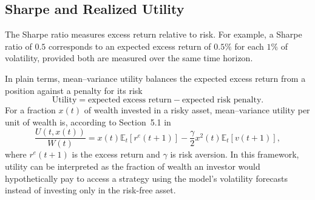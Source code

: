 \documentclass[12pt,a4paper]{article}
\numberwithin{equation}{section}
\numberwithin{table}{section}
\numberwithin{figure}{section}
\begin{document}
\subsection{Sharpe and Realized Utility}

The Sharpe ratio measures excess return relative to risk. For example, a Sharpe ratio of $0.5$ corresponds to an expected excess return of $0.5\%$ for each $1\%$ of volatility, provided both are measured over the same time horizon. 

In plain terms, mean--variance utility balances the expected excess return from a position against a penalty for its risk
\begin{equation*}
\text{Utility}=\text{expected excess return}-\text{expected risk penalty}.
\end{equation*}
For a fraction $x(t)$ of wealth invested in a risky asset, mean--variance utility per unit of wealth is, according to Section~5.1 in \cite{bollerslev2018risk}
\begin{equation}\label{eq:mean-variance-utility}
\frac{U(t,x(t))}{W(t)}=x(t)\mathbb E_t[r^e(t+1)]-\frac{\gamma}{2}x^2(t)\mathbb E_t[v(t+1)],
\end{equation}
where $r^e(t+1)$ is the excess return and $\gamma$ is risk aversion. In this framework, utility can be interpreted as the fraction of wealth an investor would hypothetically pay to access a strategy using the model's volatility forecasts instead of investing only in the risk-free asset. 
\end{document}
